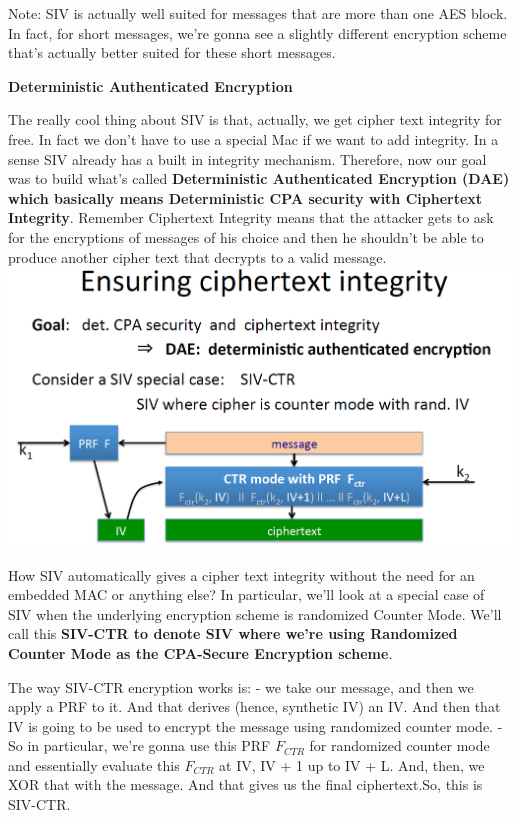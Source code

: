 \documentclass[11pt]{article}
\makeatletter
\def\maxwidth{\ifdim\Gin@nat@width>\linewidth\linewidth
    \else\Gin@nat@width\fi}
\let\Oldincludegraphics\includegraphics
\renewcommand{\includegraphics}[1]{\Oldincludegraphics[width=.8\maxwidth]{#1}}
\makeatother
\begin{document}
Note: SIV is actually well suited for messages that are more than one
AES block. In fact, for short messages, we're gonna see a slightly
different encryption scheme that's actually better suited for these
short messages.

\textbf{Deterministic Authenticated Encryption}

The really cool thing about SIV is that, actually, we get cipher text
integrity for free. In fact we don't have to use a special Mac if we
want to add integrity. In a sense SIV already has a built in integrity
mechanism. Therefore, now our goal was to build what's called
\textbf{Deterministic Authenticated Encryption (DAE) which basically
means Deterministic CPA security with Ciphertext Integrity}. Remember
Ciphertext Integrity means that the attacker gets to ask for the
encryptions of messages of his choice and then he shouldn't be able to
produce another cipher text that decrypts to a valid message.
\includegraphics{./Images/SIV-EnsuringCI.png}

How SIV automatically gives a cipher text integrity without the need for
an embedded MAC or anything else? In particular, we'll look at a special
case of SIV when the underlying encryption scheme is randomized Counter
Mode. We'll call this \textbf{SIV-CTR to denote SIV where we're using
Randomized Counter Mode as the CPA-Secure Encryption scheme}.

The way SIV-CTR encryption works is: - we take our message, and then we
apply a PRF to it. And that derives (hence, synthetic IV) an IV. And
then that IV is going to be used to encrypt the message using randomized
counter mode. - So in particular, we're gonna use this PRF \(F_{CTR}\)
for randomized counter mode and essentially evaluate this \(F_{CTR}\) at
IV, IV + 1 up to IV + L. And, then, we XOR that with the message. And
that gives us the final ciphertext.So, this is SIV-CTR.
\end{document}
